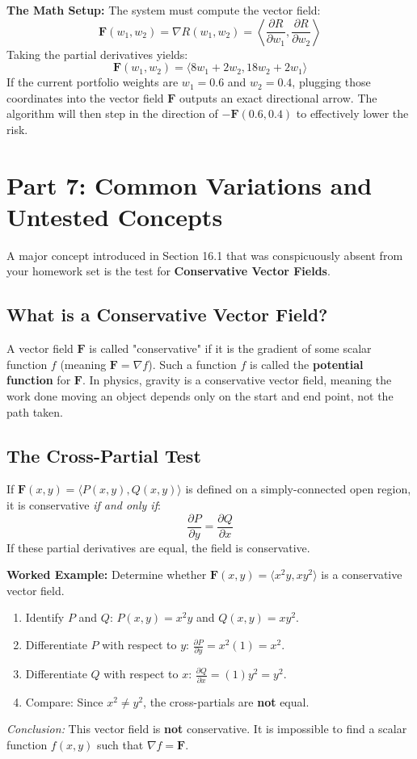 \documentclass[11pt]{article}
\begin{document}
\textbf{The Math Setup:}
The system must compute the vector field:
\[ \mathbf{F}(w_1, w_2) = \nabla R(w_1, w_2) = \left\langle \frac{\partial R}{\partial w_1}, \frac{\partial R}{\partial w_2} \right\rangle \]
Taking the partial derivatives yields:
\[ \mathbf{F}(w_1, w_2) = \langle 8w_1 + 2w_2, 18w_2 + 2w_1 \rangle \]
If the current portfolio weights are $w_1 = 0.6$ and $w_2 = 0.4$, plugging those coordinates into the vector field $\mathbf{F}$ outputs an exact directional arrow. The algorithm will then step in the direction of $-\mathbf{F}(0.6, 0.4)$ to effectively lower the risk.

\section{Part 7: Common Variations and Untested Concepts}

A major concept introduced in Section 16.1 that was conspicuously absent from your homework set is the test for \textbf{Conservative Vector Fields}.

\subsection{What is a Conservative Vector Field?}
A vector field $\mathbf{F}$ is called "conservative" if it is the gradient of some scalar function $f$ (meaning $\mathbf{F} = \nabla f$). Such a function $f$ is called the \textbf{potential function} for $\mathbf{F}$. In physics, gravity is a conservative vector field, meaning the work done moving an object depends only on the start and end point, not the path taken.

\subsection{The Cross-Partial Test}
If $\mathbf{F}(x, y) = \langle P(x, y), Q(x, y) \rangle$ is defined on a simply-connected open region, it is conservative \textit{if and only if}:
\[ \frac{\partial P}{\partial y} = \frac{\partial Q}{\partial x} \]
If these partial derivatives are equal, the field is conservative.

\textbf{Worked Example:}
Determine whether $\mathbf{F}(x, y) = \langle x^2y, xy^2 \rangle$ is a conservative vector field.
\begin{enumerate}
    \item Identify $P$ and $Q$: $P(x,y) = x^2y$ and $Q(x,y) = xy^2$.
    \item Differentiate $P$ with respect to $y$: $\frac{\partial P}{\partial y} = x^2(1) = x^2$.
    \item Differentiate $Q$ with respect to $x$: $\frac{\partial Q}{\partial x} = (1)y^2 = y^2$.
    \item Compare: Since $x^2 \neq y^2$, the cross-partials are \textbf{not} equal. 
\end{enumerate}
\textit{Conclusion:} This vector field is \textbf{not} conservative. It is impossible to find a scalar function $f(x,y)$ such that $\nabla f = \mathbf{F}$.
\end{document}
